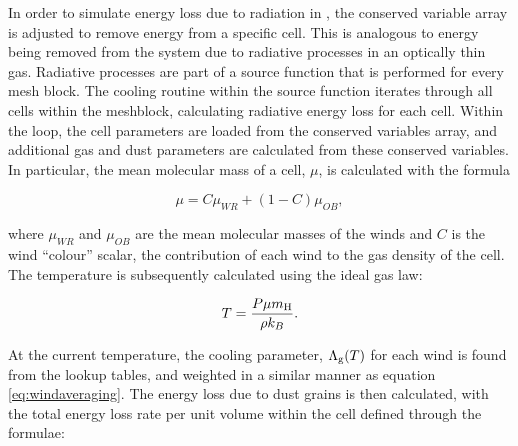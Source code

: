 In order to simulate energy loss due to radiation in \athena{}, the conserved variable array is adjusted to remove energy from a specific cell.
This is analogous to energy being removed from the system due to radiative processes in an optically thin gas.
Radiative processes are part of a source function that is performed for every mesh block.
The cooling routine within the source function iterates through all cells within the meshblock, calculating radiative energy loss for each cell.
Within the loop, the cell parameters are loaded from the conserved variables array, and additional gas and dust parameters are calculated from these conserved variables.
In particular, the mean molecular mass of a cell, $\mu$, is calculated with the formula

\begin{equation}
  \mu = C\mu_{WR} + (1-C) \mu_{OB}, \label{eq:windaveraging}
\end{equation}

\noindent
where $\mu_{WR}$ and $\mu_{OB}$ are the mean molecular masses of the winds and $C$ is the wind ``colour'' scalar, the contribution of each wind to the gas density of the cell.
The temperature is subsequently calculated using the ideal gas law:

\begin{equation}
  \label{eq:c3-idealgas}
  T = \frac{P \mu m_\text{H}}{\rho k_B}.
\end{equation}

\noindent
At the current temperature, the cooling parameter, $\Lambda_\text{g}(T)$ for each wind is found from the lookup tables, and weighted in a similar manner as equation \ref{eq:windaveraging}. The energy loss due to dust grains is then calculated, with the total energy loss rate per unit volume within the cell defined through the formulae:



